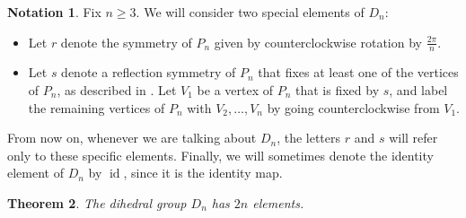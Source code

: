 \documentclass[12pt]{report}
\newtheorem{theorem}{Theorem}[chapter]
\numberwithin{equation}{section}
\numberwithin{theorem}{chapter}
\theoremstyle{definition}
\newtheorem*{basic properties}{Basic Properties}
\newtheorem*{Important Remark}{Important Remark}
\newtheorem{notation}[theorem]{Notation}
\DeclareMathOperator{\id}{id}
\begin{document}
\begin{notation}\label{defining r and s}
	Fix $n \geqslant 3$. We will consider two special elements of $D_n$: 
\begin{itemize}
	\item Let $r$ denote the symmetry of $P_n$ given by counterclockwise rotation by $\frac{2 \pi}{n}$.
	\item Let $s$ denote a reflection symmetry of $P_n$ that fixes at least one of the vertices of $P_n$, as described in . Let $V_1$ be a vertex of $P_n$ that is fixed by $s$, and label the remaining vertices of $P_n$ with $V_2, \ldots, V_{n}$ by going counterclockwise from $V_1$.
\end{itemize}

From now on, whenever we are talking about $D_n$, the letters $r$ and $s$ will refer only to these specific elements. Finally, we will sometimes denote the identity element of $D_n$ by $\id$, since it is the identity map.
\end{notation}






\begin{theorem}\label{D_n has n elements}
	The dihedral group $D_n$ has $2n$ elements.
\end{theorem}
\end{document}
